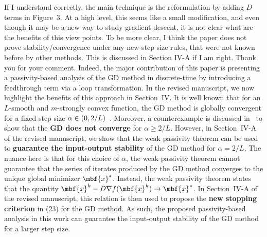 \begin{rebuttal}[pending]
    {%
        If I understand correctly, the main technique is the reformulation by adding $D$ terms in Figure~3. At a high level, this seems like a small modification, and even though it may be a new way to study gradient descent, it is not clear what are the benefits of this view points. To be more clear, I think the paper does not prove stability/convergence under any new step size rules, that were not known before by other methods. This is discussed in Section IV-A if I am right.
    }%
    {%
        Thank you for your comment. Indeed, the major contribution of this paper is presenting a passivity-based analysis of the GD method in discrete-time by introducing a feedthrough term via a loop transformation. In the revised manuscript, we now highlight the benefits of this approach in Section~IV\@. It is well known that for an $L$-smooth and $m$-strongly convex function, the GD method is globally convergent for a fixed step size \(\alpha \in \mleft( 0, 2/L \mright)\)~\cite[Theorem~2]{Polyak}. Moreover, a counterexample is discussed in~\cite{Polyak} to show that the \textbf{GD does not converge} for \(\alpha \geq 2/L\). However, in Section~IV-A of the revised manuscript, we show that the weak passivity theorem can be used to \textbf{guarantee the input-output stability} of the GD method for \(\alpha = 2/L\). The nuance here is that for this choice of \(\alpha\), the weak passivity theorem cannot guarantee that the series of iterates produced by the GD method converges to the unique global minimizer \(\mbf{x}^\ast\). Instead, the weak passivity theorem states that the quantity \(\mbf{x}^k-D \nabla f(\mbf{x}^k ) \to \mbf{x}^\ast\). In Section~IV-A of the revised manuscript, this relation is then used to propose the \textbf{new stopping criterion} in (23) for the GD method. As such, the proposed passivity-based analysis in this work can guarantee the input-output stability of the GD method for a larger step size.
    }%
\end{rebuttal}
